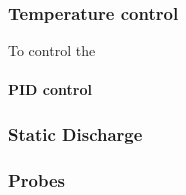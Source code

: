 \documentclass[../../Matt_Gebert_Honours_Thesis.tex]{subfiles}
\begin{document}
	\subsubsection{Temperature control}
	To control the 
	
	\paragraph{PID control}
	\subsubsection{Static Discharge}
	\subsubsection{Probes}
	
	
\end{document}
